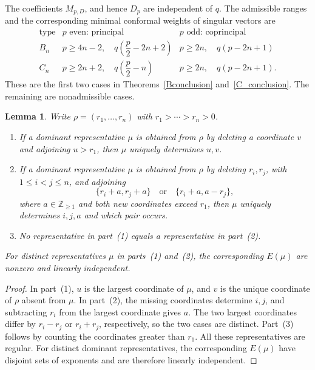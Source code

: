 \documentclass[11pt,a4paper]{amsart}
\newcommand{\ZZ}{\mathbb Z}
\theoremstyle{plain}
\newtheorem{lem}[theorem]{Lemma}
\numberwithin{equation}{section}
\newenvironment{pf}{\begin{proof}}{\end{proof}}
\begin{document}
The coefficients \(M_{p,D}\), and hence \(D_p\)  are independent
of \(q\).
The admissible ranges \cite{KW89} and the corresponding minimal
conformal weights of singular vectors
\cite[Corollary~2.1]{CL22} are
\[
\begin{array}{c|c|c}
\text{type}
&p\text{ even: principal}
&p\text{ odd: coprincipal}\\ \hline
B_n&
p\ge4n-2,\quad q\left(\dfrac p2-2n+2\right)&
p\ge2n,\quad q(p-2n+1)\\[2mm]
C_n&
p\ge2n+2,\quad q\left(\dfrac p2-n\right)&
p\ge2n,\quad q(p-2n+1).
\end{array}
\]
These are the first two cases in
Theorems~\ref{Bconclusion} and~\ref{C_conclusion}.
The remaining  are nonadmissible cases.

\begin{lem}
\label{lem:signed-permutation-orbit-recovery}
Write \(\rho=(r_1,\ldots,r_n)\) with
\(r_1>\cdots>r_n>0\).
\begin{enumerate}
\item
If a dominant representative \(\mu\) is obtained from \(\rho\)
by deleting a coordinate \(v\) and adjoining \(u>r_1\),
then \(\mu\) uniquely determines \(u,v\).
\item
If a dominant representative \(\mu\) is obtained from \(\rho\)
by deleting \(r_i,r_j\), with \(1\le i<j\le n\), and adjoining
\[
\{r_i+a,r_j+a\}
\quad\text{or}\quad
\{r_i+a,a-r_j\},
\]
where \(a\in\ZZ_{\ge1}\) and both new coordinates exceed \(r_1\),
then \(\mu\) uniquely determines \(i,j,a\) and which pair occurs.
\item
No representative in part~(1) equals a representative in part~(2).
\end{enumerate}
For distinct representatives \(\mu\) in parts~(1) and~(2),
the corresponding \(E(\mu)\) are nonzero and linearly independent.
\end{lem}

\begin{pf}
In part~(1), \(u\) is the largest coordinate of \(\mu\),
and \(v\) is the unique coordinate of \(\rho\) absent from \(\mu\).
In part~(2), the missing coordinates determine \(i,j\),
and subtracting \(r_i\) from the largest coordinate gives \(a\).
The two largest coordinates differ by \(r_i-r_j\) or
\(r_i+r_j\), respectively, so the two cases are distinct.
Part~(3) follows by counting the coordinates greater than \(r_1\).
All these representatives are regular.
For distinct dominant representatives, the corresponding
\(E(\mu)\) have disjoint sets of exponents and are therefore
linearly independent.
\end{pf}
\end{document}
